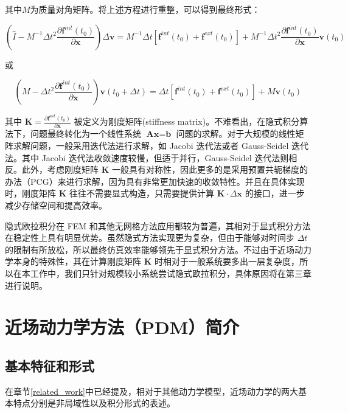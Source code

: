 其中$M$为质量对角矩阵。将上述方程进行重整，可以得到最终形式：

\begin{equation}
\left(\hat{I} - M^{-1}\Delta t^2 \frac{\partial \textbf{f}^{int}(t_0)}{\partial \textbf{x}}\right)\Delta \textbf{v} = M^{-1}\Delta t\left[\textbf{f}^{int}(t_0) + \textbf{f}^{ext}(t_0)\right]
                  + M^{-1}\Delta t^2 \frac{\partial \textbf{f}^{int}(t_0)}{\partial \textbf{x}}\textbf{v}(t_0)
\end{equation}

或

\begin{equation}
\left(M - \Delta t^2 \frac{\partial \textbf{f}^{int}(t_0)}{\partial \textbf{x}}\right)\textbf{v}(t_0 + \Delta t) = \Delta t\left[\textbf{f}^{int}(t_0) + \textbf{f}^{ext}(t_0)\right]
                  + M\textbf{v}(t_0)
\end{equation}

其中 $\textbf{K} = \frac{\partial \textbf{f}^{int}(t_0)}{\partial \textbf{x}}$ 被定义为刚度矩阵(stiffness matrix)。不难看出，在隐式积分算法下，问题最终转化为一个线性系统 $\textbf{Ax} = \textbf{b}$ 问题的求解。对于大规模的线性矩阵求解问题，一般采用迭代法进行求解，如 Jacobi 迭代法或者 Gauss-Seidel 迭代法。其中 Jacobi 迭代法收敛速度较慢，但适于并行，Gauss-Seidel 迭代法则相反。此外，考虑刚度矩阵 $\textbf{K}$ 一般具有对称性，因此更多的是采用预置共轭梯度的办法（PCG）来进行求解，因为具有非常更加快速的收敛特性。并且在具体实现时，刚度矩阵 $\textbf{K}$ 往往不需要显式构造，只需要提供计算 $\textbf{K} \cdot \Delta \textbf{x}$ 的接口，进一步减少存储空间和提高效率。

隐式欧拉积分在 FEM 和其他无网格方法应用都较为普遍，其相对于显式积分方法在稳定性上具有明显优势。虽然隐式方法实现更为复杂，但由于能够对时间步 $\Delta t$ 的限制有所放松，所以最终仿真效率能够领先于显式积分方法。不过由于近场动力学本身的特殊性，其在计算刚度矩阵 $\textbf{K}$ 时相对于一般系统要多出一层复杂度，所以在本工作中，我们只针对规模较小系统尝试隐式欧拉积分，具体原因将在第三章进行说明。


\section{近场动力学方法（PDM）简介}

\subsection{基本特征和形式}
\label{pdm_basic_feature}
在章节\ref{related_work}中已经提及，相对于其他动力学模型，近场动力学的两大基本特点分别是非局域性以及积分形式的表述。

